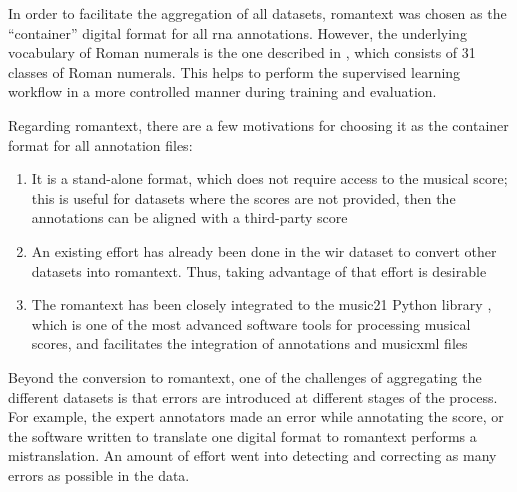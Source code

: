 
In order to facilitate the aggregation of all datasets,
\gls{romantext} was chosen as the ``container'' digital
format for all \gls{rna} annotations. However, the
underlying vocabulary of Roman numerals is the one described
in , which consists of
31 classes of Roman numerals. This helps to perform the
supervised learning workflow in a more controlled manner
during training and evaluation.

Regarding \gls{romantext}, there are a few motivations for
choosing it as the container format for all annotation
files:

\begin{enumerate} 
    \item It is a stand-alone format, which does not require
    access to the musical score; this is useful for datasets
    where the scores are not provided, then the annotations
    can be aligned with a third-party score
    \item An existing effort has already been done in the
    \gls{wir} dataset
    \parencite{gotham2019romantext, gotham2022openscore}
    to convert other datasets into \gls{romantext}. Thus,
    taking advantage of that effort is desirable 
    \item The \gls{romantext} has been closely integrated to
    the music21 Python library
    \parencite{cuthbert2010music21}, which is one of the
    most advanced software tools for processing musical
    scores, and facilitates the integration of annotations
    and \gls{musicxml} files 
\end{enumerate}

Beyond the conversion to \gls{romantext}, one of the
challenges of aggregating the different datasets is that
errors are introduced at different stages of the process.
For example, the expert annotators made an error while
annotating the score, or the software written to translate
one digital format to \gls{romantext} performs a
mistranslation. An amount of effort went into detecting and
correcting as many errors as possible in the data.


